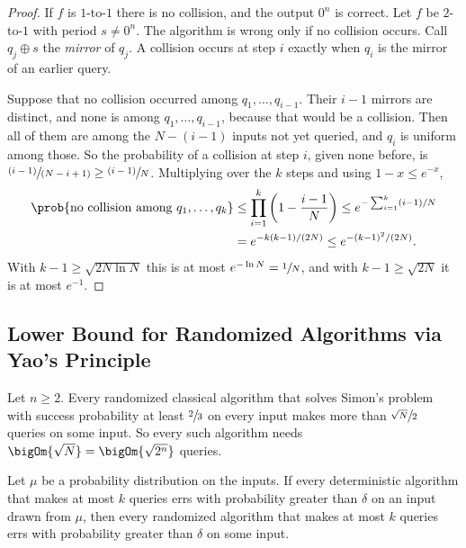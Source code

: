 \begin{proof}
    If $f$ is $1$-to-$1$ there is no collision, and the output $0^n$ is correct. Let $f$ be $2$-to-$1$
    with period $s \neq 0^n$. The algorithm is wrong only if no collision occurs. Call $q_j \oplus s$
    the \emph{mirror} of $q_j$. A collision occurs at step $i$ exactly when $q_i$ is the mirror of an
    earlier query.

    Suppose that no collision occurred among $q_1, \dots, q_{i-1}$. Their $i - 1$ mirrors are distinct,
    and none is among $q_1, \dots, q_{i-1}$, because that would be a collision. Then all of them are
    among the $N - (i-1)$ inputs not yet queried, and $q_i$ is uniform among those. So the
    probability of a collision at step $i$, given none before, is
    $\sfrac{(i-1)}{(N-i+1)} \geq \sfrac{(i-1)}{N}$. Multiplying over the $k$ steps and using
    $1 - x \leq e^{-x}$,
    \begin{align*}
        \prob{\text{no collision among } q_1, \dots, q_k}
         & \leq \prod_{i=1}^{k} \left(1 - \frac{i-1}{N}\right)
        \leq e^{-\sum_{i=1}^{k} (i-1)/N} \\
         & = e^{-k(k-1)/(2N)} \leq e^{-(k-1)^2/(2N)}.
    \end{align*}
    With $k - 1 \geq \sqrt{2N \ln N}$ this is at most $e^{-\ln N} = \sfrac{1}{N}$, and with
    $k - 1 \geq \sqrt{2N}$ it is at most $e^{-1}$.
\end{proof}

\subsection{Lower Bound for Randomized Algorithms via Yao's Principle}

\begin{theorem}\label{thm:simon-rand-lb-1001}
    Let $n \geq 2$. Every randomized classical algorithm that solves Simon's problem with success
    probability at least $\sfrac{2}{3}$ on every input makes more than $\sfrac{\sqrt{N}}{2}$ queries on
    some input. So every such algorithm needs $\bigOm{\sqrt{N}} = \bigOm{\sqrt{2^n}}$ queries.
\end{theorem}

\begin{lemma}\label{lem:yao-1001}
    Let $\mu$ be a probability distribution on the inputs. If every deterministic algorithm that makes at
    most $k$ queries errs with probability greater than $\delta$ on an input drawn from $\mu$, then every
    randomized algorithm that makes at most $k$ queries errs with probability greater than $\delta$ on
    some input.
\end{lemma}

